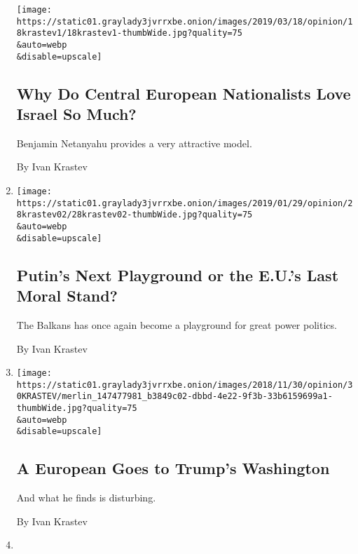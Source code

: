 \begin{enumerate}
  \texttt{[image: https://static01.graylady3jvrrxbe.onion/images/2019/03/18/opinion/18krastev1/18krastev1-thumbWide.jpg?quality=75\\\&auto=webp\\\&disable=upscale]}

  \hypertarget{why-do-central-european-nationalists-love-israel-so-much}{%
  \subsection{Why Do Central European Nationalists Love Israel So
  Much?}\label{why-do-central-european-nationalists-love-israel-so-much}}

  Benjamin Netanyahu provides a very attractive model.

  By Ivan Krastev
\item
  \href{/2019/01/28/opinion/russia-eu-balkans.html}{}

  \texttt{[image: https://static01.graylady3jvrrxbe.onion/images/2019/01/29/opinion/28krastev02/28krastev02-thumbWide.jpg?quality=75\\\&auto=webp\\\&disable=upscale]}

  \hypertarget{putins-next-playground-or-the-eus-last-moral-stand}{%
  \subsection{Putin's Next Playground or the E.U.'s Last Moral
  Stand?}\label{putins-next-playground-or-the-eus-last-moral-stand}}

  The Balkans has once again become a playground for great power
  politics.

  By Ivan Krastev
\item
  \href{/2018/11/30/opinion/europe-america-foreign-policy-trump.html}{}

  \texttt{[image: https://static01.graylady3jvrrxbe.onion/images/2018/11/30/opinion/30KRASTEV/merlin\_147477981\_b3849c02-dbbd-4e22-9f3b-33b6159699a1-thumbWide.jpg?quality=75\\\&auto=webp\\\&disable=upscale]}

  \hypertarget{a-european-goes-to-trumps-washington}{%
  \subsection{A European Goes to Trump's
  Washington}\label{a-european-goes-to-trumps-washington}}

  And what he finds is disturbing.

  By Ivan Krastev
\item
  \href{/2018/08/19/opinion/steve-bannon-europe-movement-far-right.html}{}


\end{enumerate}
